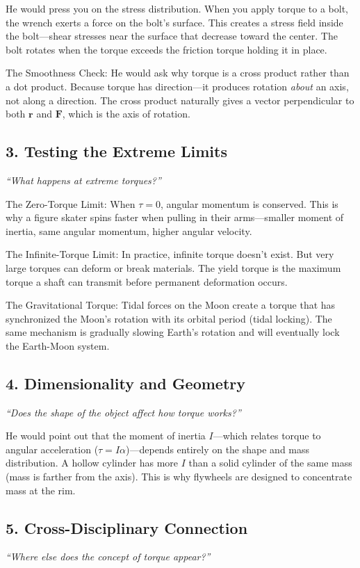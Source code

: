 He would press you on the stress distribution. When you apply torque to a bolt, the wrench exerts a force on the bolt's surface. This creates a stress field inside the bolt---shear stresses near the surface that decrease toward the center. The bolt rotates when the torque exceeds the friction torque holding it in place.

The Smoothness Check: He would ask why torque is a cross product rather than a dot product. Because torque has direction---it produces rotation \emph{about} an axis, not along a direction. The cross product naturally gives a vector perpendicular to both $\mathbf{r}$ and $\mathbf{F}$, which is the axis of rotation.

\subsection*{3. Testing the Extreme Limits}
\textit{``What happens at extreme torques?''}

The Zero-Torque Limit: When $\tau = 0$, angular momentum is conserved. This is why a figure skater spins faster when pulling in their arms---smaller moment of inertia, same angular momentum, higher angular velocity.

The Infinite-Torque Limit: In practice, infinite torque doesn't exist. But very large torques can deform or break materials. The yield torque is the maximum torque a shaft can transmit before permanent deformation occurs.

The Gravitational Torque: Tidal forces on the Moon create a torque that has synchronized the Moon's rotation with its orbital period (tidal locking). The same mechanism is gradually slowing Earth's rotation and will eventually lock the Earth-Moon system.

\subsection*{4. Dimensionality and Geometry}
\textit{``Does the shape of the object affect how torque works?''}

He would point out that the moment of inertia $I$---which relates torque to angular acceleration ($\tau = I\alpha$)---depends entirely on the shape and mass distribution. A hollow cylinder has more $I$ than a solid cylinder of the same mass (mass is farther from the axis). This is why flywheels are designed to concentrate mass at the rim.

\subsection*{5. Cross-Disciplinary Connection}
\textit{``Where else does the concept of torque appear?''}

